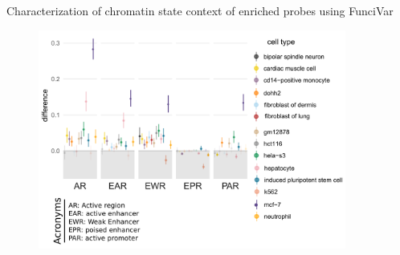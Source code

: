 \documentclass[slidestop,compress,11pt,xcolor=dvipsnames]{beamer}
\begin{document}
\begin{frame}{Characterization of chromatin state context of enriched probes using FunciVar}
 \vspace*{-0.3cm}
 \begin{figure}[ht!]
  \centering
  \includegraphics[width=0.9\textwidth]{images/1.png}%
 \end{figure}
\end{frame}


\end{document}
